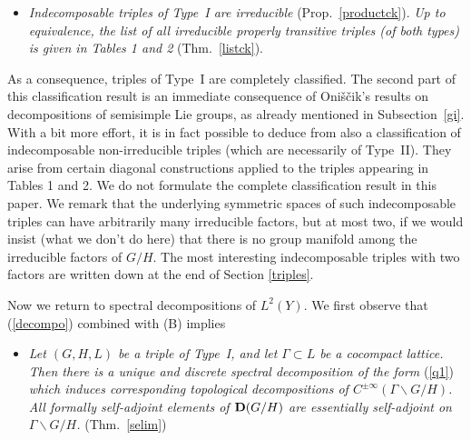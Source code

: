\documentclass[10]{amsart}
\theoremstyle{remark}
\theoremstyle{definition}
\numberwithin{equation}{section}
\begin{document}
\begin{itemize}
\item[({\bf C})] {\em Indecomposable triples of Type~I are irreducible} (Prop.~\ref{productck}). {\em  Up to
equivalence, the list of all irreducible properly transitive triples  (of both types) is given in Tables 1 and 2} (Thm.~\ref{listck}).
\end{itemize}
As a consequence, triples of Type~I are completely classified. The second part of this classification result is an immediate consequence of Oni\v s\v cik's results \cite{Oni69} on decompositions
of semisimple Lie groups, as already mentioned in Subsection~\ref{gi}. With a bit more effort, it is in fact possible to deduce from \cite{Oni69} also a classification of indecomposable non-irreducible triples
(which are necessarily of Type~II). They arise from certain diagonal constructions applied to the triples appearing in Tables 1 and 2. We do not formulate the complete classification result in this paper.
We remark that the underlying symmetric spaces of such indecomposable triples can have arbitrarily many irreducible factors, but at most two, if we would insist (what we don't do here) that there is no group manifold among the irreducible factors of $G/H$. The most interesting indecomposable triples with two
factors are written down at the end of Section \ref{triples}.

Now we return to spectral decompositions of $L^2(Y)$. We first observe that  (\ref{decompo}) combined with ({B}) implies 
\begin{itemize}
\item[({\bf D})] {\em Let $(G,H,L)$ be a triple of Type~I, and let $\Gamma\subset L$ be a cocompact lattice. Then there is a unique and discrete spectral decomposition of the form} (\ref{q1})
{\em which induces corresponding topological decompositions of $C^{\pm\infty}(\Gamma\backslash G/H)$. All formally self-adjoint elements of   ${\bf D}(G/H)$ are essentially self-adjoint on $\Gamma\backslash G/H$.} (Thm.~\ref{selim})
\end{itemize}
\end{document}
